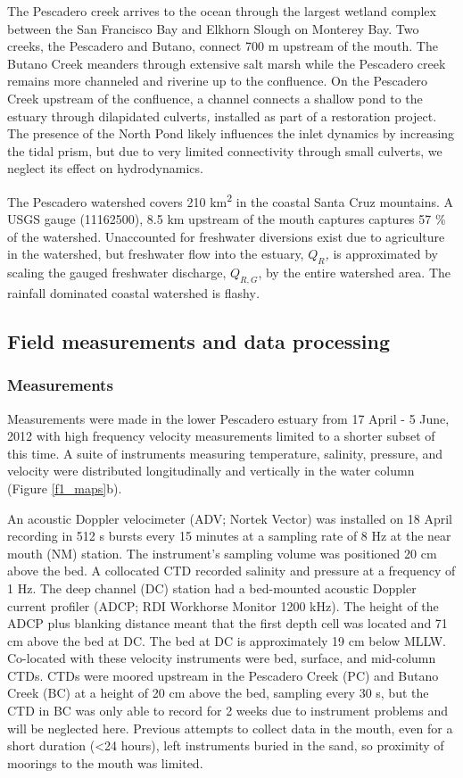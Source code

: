 The Pescadero creek arrives to the ocean through the largest wetland
complex between the San Francisco Bay and Elkhorn Slough on Monterey
Bay. Two creeks, the Pescadero and Butano, connect 700 m upstream
of the mouth. The Butano Creek meanders through extensive salt marsh
while the Pescadero creek remains more channeled and riverine up to
the confluence. On the Pescadero Creek upstream of the confluence,
a channel connects a shallow pond to the estuary through dilapidated
culverts\emph{, }installed as part of a restoration project. The presence
of the North Pond likely influences the inlet dynamics by increasing
the tidal prism, but due to very limited connectivity through small
culverts, we neglect its effect on hydrodynamics.

The Pescadero watershed covers 210 km\textsuperscript{2} in the coastal
Santa Cruz mountains. A USGS gauge (11162500), 8.5 km upstream of
the mouth captures captures 57 \% of the watershed. Unaccounted for
freshwater diversions exist due to agriculture in the watershed, but
freshwater flow into the estuary, \emph{$Q_{R}$, }is approximated
by scaling the gauged freshwater discharge, $Q_{R,G}$, by the entire
watershed area. The rainfall dominated coastal watershed is flashy\emph{.}


\subsection{Field measurements and data processing}


\subsubsection{Measurements}

Measurements were made in the lower Pescadero estuary from 17 April
- 5 June, 2012 with high frequency velocity measurements limited to
a shorter subset of this time. A suite of instruments measuring temperature,
salinity, pressure, and velocity were distributed longitudinally and
vertically in the water column (Figure \ref{f1_maps}b).

An acoustic Doppler velocimeter (ADV; Nortek Vector) was installed
on 18 April recording in 512 s bursts every 15 minutes at a sampling
rate of 8 Hz at the near mouth (NM) station. The instrument's sampling
volume was positioned 20 cm above the bed. A collocated CTD recorded
salinity and pressure at a frequency of 1 Hz. The deep channel (DC)
station had a bed-mounted acoustic Doppler current profiler (ADCP;
RDI Workhorse Monitor 1200 kHz). The height of the ADCP plus blanking
distance meant that the first depth cell was located and 71 cm above
the bed at DC. The bed at DC is approximately 19 cm below MLLW. Co-located
with these velocity instruments were bed, surface, and mid-column
CTDs. CTDs were moored upstream in the Pescadero Creek (PC) and Butano
Creek (BC) at a height of 20 cm above the bed, sampling every 30 s,
but the CTD in BC was only able to record for 2 weeks due to instrument
problems and will be neglected here. Previous attempts to collect
data in the mouth, even for a short duration (<24 hours), left instruments
buried in the sand, so proximity of moorings to the mouth was limited. 

